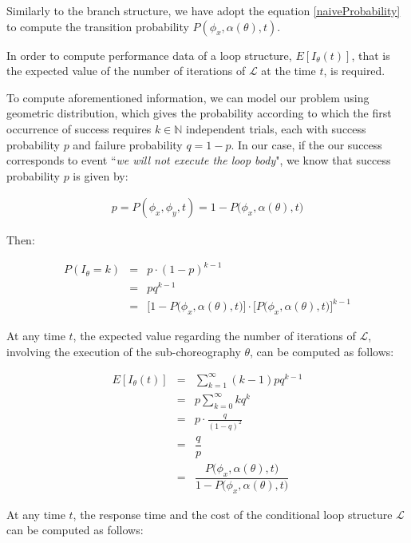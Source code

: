 \documentclass[12pt,a4paper]{report}
\newcommand{\N}{\mathbb{N}}
\begin{document}
Similarly to the branch structure, we have adopt the equation \ref{naiveProbability} to compute the transition probability $P(\phi_{x}, \alpha(\theta), t)$.

In order to compute performance data of a loop structure, $E[I_{\theta}(t)]$, that is the expected value of the number of iterations of $\mathcal{L}$ at the time $t$, is required.

To compute aforementioned information, we can model our problem using geometric distribution, which gives the probability according to which the first occurrence of success requires $k \in \N$ independent trials, each with success probability $p$ and failure probability $q = 1 - p$. In our case, if the our success corresponds to event ``\textit{we will not execute the loop body}", we know that success probability $p$ is given by:

\begin{eqnarray}
	p = P(\phi_x,\phi_y,t) = 1 - P\Big(\phi_{x}, \alpha(\theta),t\Big)
\end{eqnarray}

Then:

\begin{eqnarray}
	P(I_{\theta} = k) & = & p \cdot (1-p)^{k-1} \nonumber \\
	& = & pq^{k-1} \nonumber \\
	& = & \Big[  1 - P\Big(\phi_{x}, \alpha(\theta),t\Big) \Big] \cdot \bigg[  P\Big(\phi_{x}, \alpha(\theta),t\Big) \bigg] ^{k-1}
\end{eqnarray}

At any time $t$, the expected value regarding the number of iterations of $\mathcal{L}$, involving the execution of the sub-choreography $\theta$, can be computed as follows:

\begin{eqnarray}
	E[I_{\theta}(t)] & = & \sum_{k = 1}^\infty (k-1) pq^{k-1} \nonumber \\
	& = & p \sum_{k = 0}^\infty kq^{k} \nonumber \\
	& = & p \cdot \frac{q}{(1-q)^2} \nonumber \\
	& = & \dfrac{q}{p} \nonumber \\
	& = & \dfrac{P\Big(\phi_{x}, \alpha(\theta),t\Big)}{1 - P\Big(\phi_{x}, \alpha(\theta),t\Big)} 
\end{eqnarray}

At any time $t$, the response time and the cost of the conditional loop structure $\mathcal{L}$ can be computed as follows:
\end{document}
